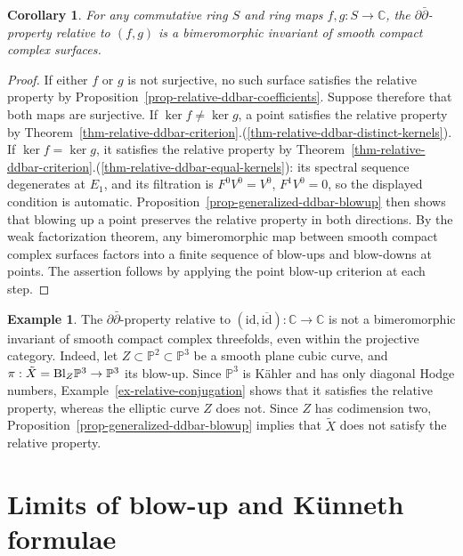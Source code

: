 \documentclass[11pt]{amsart}
\numberwithin{equation}{section}
\def\Bl{{\rm Bl}}
\theoremstyle{plain}
\newtheorem{Cor}[thm]{Corollary}
\theoremstyle{definition}
\newtheorem{Ex}[thm]{Example}
\begin{document}
\begin{Cor}\label{cor-relative-ddbar-surfaces}
For any commutative ring $S$ and ring maps $f,g:S\to\mathbb C$, the
$\partial\bar\partial$-property relative to $(f,g)$ is a bimeromorphic
invariant of smooth compact complex surfaces.
\end{Cor}
\begin{proof}
If either $f$ or $g$ is not surjective, no such surface satisfies the
relative property by Proposition~\ref{prop-relative-ddbar-coefficients}.
Suppose therefore that both maps are surjective. If $\ker f\ne\ker g$,
a point satisfies the relative property by
Theorem~\ref{thm-relative-ddbar-criterion}.(\ref{thm-relative-ddbar-distinct-kernels}).
If $\ker f=\ker g$, it satisfies the relative property by
Theorem~\ref{thm-relative-ddbar-criterion}.(\ref{thm-relative-ddbar-equal-kernels}):
its spectral sequence degenerates at $E_1$, and its filtration is
$F^0V^0=V^0$, $F^1V^0=0$, so the displayed condition is automatic.
Proposition~\ref{prop-generalized-ddbar-blowup}
then shows that blowing up a point preserves the relative property in
both directions. By the weak factorization theorem, any bimeromorphic map
between smooth compact complex surfaces factors into a finite sequence
of blow-ups and blow-downs at points.
The assertion follows by applying the point blow-up criterion at each step.
\end{proof}

\begin{Ex}\label{ex-relative-ddbar-threefold-blowup}
The $\partial\bar\partial$-property relative to
$(\mathrm{id},\overline{\mathrm{id}}):\mathbb C\to\mathbb C$ is not a
bimeromorphic invariant of smooth compact complex threefolds, even within
the projective category. Indeed, let $Z\subset\mathbb P^2\subset\mathbb P^3$
be a smooth plane cubic curve, and
$\pi:\tilde{X}=\Bl_Z\mathbb P^3\to\mathbb P^3$ its blow-up.
Since $\mathbb P^3$ is K\"ahler and has only diagonal Hodge numbers,
Example~\ref{ex-relative-conjugation} shows that it satisfies the relative
property, whereas the elliptic curve $Z$ does not. Since $Z$ has codimension two,
Proposition~\ref{prop-generalized-ddbar-blowup} implies that $\tilde{X}$
does not satisfy the relative property.
\end{Ex}

\section{Limits of blow-up and K\"unneth formulae}
\label{counterexample-part}
\end{document}
